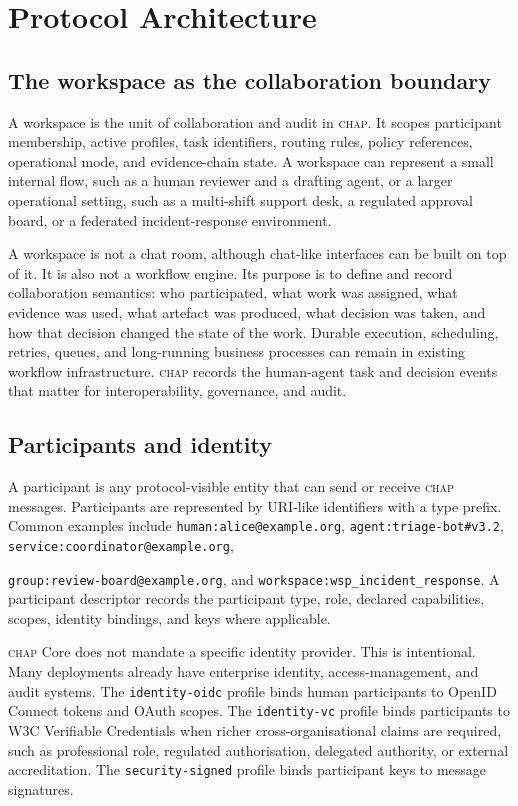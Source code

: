\documentclass[11pt]{article}
\newcommand{\chap}{\textsc{chap}}
\begin{document}
\section{Protocol Architecture}
\label{sec:architecture}

\subsection{The workspace as the collaboration boundary}

A workspace is the unit of collaboration and audit in \chap{}. It scopes participant membership, active profiles, task identifiers, routing rules, policy references, operational mode, and evidence-chain state. A workspace can represent a small internal flow, such as a human reviewer and a drafting agent, or a larger operational setting, such as a multi-shift support desk, a regulated approval board, or a federated incident-response environment.

A workspace is not a chat room, although chat-like interfaces can be built on top of it. It is also not a workflow engine. Its purpose is to define and record collaboration semantics: who participated, what work was assigned, what evidence was used, what artefact was produced, what decision was taken, and how that decision changed the state of the work. Durable execution, scheduling, retries, queues, and long-running business processes can remain in existing workflow infrastructure. \chap{} records the human-agent task and decision events that matter for interoperability, governance, and audit.

\subsection{Participants and identity}

A participant is any protocol-visible entity that can send or receive \chap{} messages. Participants are represented by URI-like identifiers with a type prefix. Common examples include \texttt{human:alice@example.org}, \texttt{agent:triage-bot\#v3.2}, \texttt{service:coordinator@example.org}, 

\noindent \texttt{group:review-board@example.org}, and \texttt{workspace:wsp\_incident\_response}. A participant descriptor records the participant type, role, declared capabilities, scopes, identity bindings, and keys where applicable.

\chap{} Core does not mandate a specific identity provider. This is intentional. Many deployments already have enterprise identity, access-management, and audit systems. The \texttt{identity-oidc} profile binds human participants to OpenID Connect tokens and OAuth scopes. The \texttt{identity-vc} profile binds participants to W3C Verifiable Credentials when richer cross-organisational claims are required, such as professional role, regulated authorisation, delegated authority, or external accreditation. The \texttt{security-signed} profile binds participant keys to message signatures.
\end{document}

